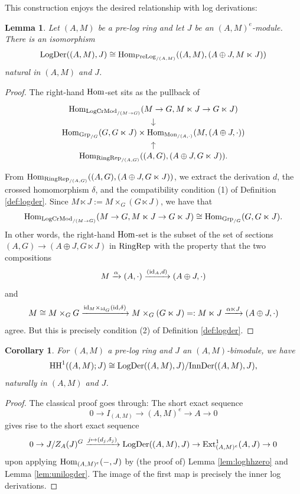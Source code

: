 \documentclass[a4paper,10pt%
]{amsart}
\numberwithin{equation}{section}
\newtheorem{corollary}[subsection]{Corollary}
\newtheorem{lemma}[subsection]{Lemma}
\theoremstyle{definition}
\renewcommand{\:}{\colon}
\begin{document}
\noindent This construction enjoys the desired relationship with log derivations:

\begin{lemma}\label{lem:logdersqzero} Let $(A, M)$ be a pre-log ring and let $J$ be an $(A, M)^e$-module. There is an isomorphism \[{\rm LogDer}((A, M), J) \cong {\rm Hom}_{{\rm PreLog}_{/(A, M)}}((A, M), (A \oplus J, M \ltimes J))\] natural in $(A, M)$ and $J$.
\end{lemma}

\begin{proof} The right-hand ${\rm Hom}$-set sits as the pullback of \[\begin{tikzcd}[row sep = small]{\rm Hom}_{{\rm LogCrMod}_{/(M \to G)}}(M \to G, M \ltimes J \to G \ltimes J) \ar{d} \\  {\rm Hom}_{{\rm Grp}_{/G}}(G, G \ltimes J) \times {\rm Hom}_{{\rm Mon}_{/(A, \cdot)}}(M, (A \oplus J, \cdot)) \\ {\rm Hom}_{{\rm RingRep}_{/(A, G)}}((A, G), (A \oplus J, G \ltimes J)). \ar{u}\end{tikzcd}\] From ${\rm Hom}_{{\rm RingRep}_{/(A, G)}}((A, G), (A \oplus J, G \ltimes J))$, we extract the derivation $d$, the crossed homomorphism $\delta$, and the compatibility condition (1) of Definition \ref{def:logder}. Since $M \ltimes J := M \times_{G} (G \ltimes J)$, we have that \[{\rm Hom}_{{\rm LogCrMod}_{/(M \to G)}}(M \to G, M \ltimes J \to G \ltimes J) \cong {\rm Hom}_{{\rm Grp}_{/G}}(G, G \ltimes J).\] In other words, the right-hand ${\rm Hom}$-set is the subset of the set of sections $(A, G) \to (A \oplus J, G \ltimes J)$ in ${\rm RingRep}$ with the property that the two compositions \[M \xrightarrow{\alpha} (A, \cdot) \xrightarrow{({\rm id}_A, d)} (A \oplus J, \cdot)\] and \[M \cong M \times_G G \xrightarrow{{\rm id}_M \times_{{\rm id}_G} ({\rm id}, \delta)} M \times_G (G \ltimes J) =: M \ltimes J \xrightarrow{\alpha \ltimes J} (A \oplus J, \cdot)\] agree. But this is precisely condition (2) of Definition \ref{def:logder}.
\end{proof}

\begin{corollary} For $(A, M)$ a pre-log ring and $J$ an $(A, M)$-bimodule, we have \[{\rm HH}^1((A, M) ; J) \cong {\rm LogDer}((A, M), J) / {\rm InnDer}((A, M), J),\] naturally in $(A, M)$ and $J$. 
\end{corollary}

\begin{proof} The classical proof goes through: The short exact sequence \[0 \to I_{(A, M)} \to (A, M)^e \to A \to 0\] gives rise to the short exact sequence \[0 \to J / Z_A(J)^G \xrightarrow{j \mapsto (d_j, \delta_j)} {\rm LogDer}((A, M), J) \to {\rm Ext}^1_{(A, M)^e}(A, J) \to 0\] upon applying ${\rm Hom}_{(A, M)^e}(-, J)$ by (the proof of) Lemma \ref{lem:loghhzero} and Lemma \ref{lem:unilogder}. The image of the first map is precisely the inner log derivations. 
\end{proof}
\end{document}
